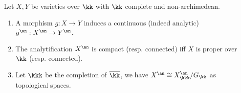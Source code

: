 \begin{proposition}[label=\labelNFM{prop:properties-of-berkovich-analytification}, status=draft, tag=0000000]
	Let $X,Y$ be varieties over $\kk$ with $\kk$ complete and non-archimedean.
	\begin{enumerate}
		\item A morphism $g:X \to Y$ induces a continuous (indeed analytic) $g^\an:X^\an \to Y^\an$.
		\item The analytification $X^\an$ is compact (resp. connected) iff $X$ is proper over $\kk$ (resp. connected).
		\item Let $\kkk$ be the completion of $\overline{\kk}$, we have $X^\an \cong X_\kkk^\an/G_\kk$ as topological spaces.
	\end{enumerate}
\end{proposition}

